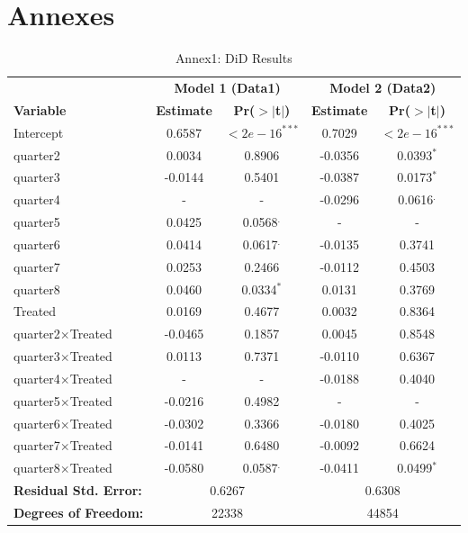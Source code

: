 \documentclass[12pt]{article}
\begin{document}
\section{Annexes}
\begin{table}[h!]
\centering
\caption{Annex1: DiD Results}
\label{tab:regression_comparison}
\begin{tabular}{lcccc}
\toprule
 & \multicolumn{2}{c}{\textbf{Model 1 (Data1)}} & \multicolumn{2}{c}{\textbf{Model 2 (Data2)}} \\
\cmidrule(lr){2-3} \cmidrule(lr){4-5}
\textbf{Variable} & \textbf{Estimate} & \textbf{Pr($>|$t$|$)} & \textbf{Estimate} & \textbf{Pr($>|$t$|$)} \\
\midrule
Intercept         & 0.6587 & $<2e-16^{***}$ & 0.7029 & $<2e-16^{***}$ \\
quarter2          & 0.0034 & 0.8906 & -0.0356 & 0.0393$^{*}$ \\
quarter3          & -0.0144 & 0.5401 & -0.0387 & 0.0173$^{*}$ \\
quarter4          & -      & -     & -0.0296 & 0.0616$^{.}$ \\
quarter5          & 0.0425 & 0.0568$^{.}$ & -      & - \\
quarter6          & 0.0414 & 0.0617$^{.}$ & -0.0135 & 0.3741 \\
quarter7          & 0.0253 & 0.2466 & -0.0112 & 0.4503 \\
quarter8          & 0.0460 & 0.0334$^{*}$ & 0.0131 & 0.3769 \\
Treated           & 0.0169 & 0.4677 & 0.0032 & 0.8364 \\
quarter2$\times$Treated & -0.0465 & 0.1857 & 0.0045 & 0.8548 \\
quarter3$\times$Treated & 0.0113 & 0.7371 & -0.0110 & 0.6367 \\
quarter4$\times$Treated & -      & -     & -0.0188 & 0.4040 \\
quarter5$\times$Treated & -0.0216 & 0.4982 & -      & - \\
quarter6$\times$Treated & -0.0302 & 0.3366 & -0.0180 & 0.4025 \\
quarter7$\times$Treated & -0.0141 & 0.6480 & -0.0092 & 0.6624 \\
quarter8$\times$Treated & -0.0580 & 0.0587$^{.}$ & -0.0411 & 0.0499$^{*}$ \\
\midrule
\multicolumn{1}{l}{\textbf{Residual Std. Error:}} & \multicolumn{2}{c}{0.6267} & \multicolumn{2}{c}{0.6308} \\
\multicolumn{1}{l}{\textbf{Degrees of Freedom:}} & \multicolumn{2}{c}{22338} & \multicolumn{2}{c}{44854} \\

\end{tabular}
\end{table}
\end{document}
